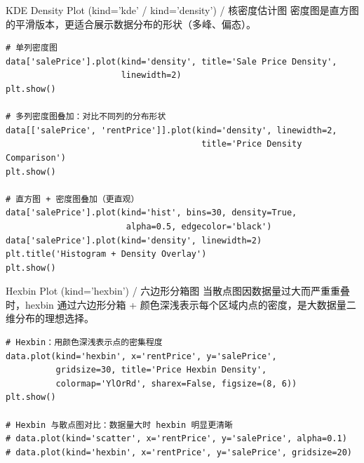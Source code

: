 \documentclass[11pt,a4paper]{report}
\begin{document}
\begin{examplebox}{KDE Density Plot (kind='kde' / kind='density') / 核密度估计图}
    密度图是直方图的平滑版本，更适合展示数据分布的形状（多峰、偏态）。
\begin{lstlisting}
# 单列密度图
data['salePrice'].plot(kind='density', title='Sale Price Density',
                       linewidth=2)
plt.show()

# 多列密度图叠加：对比不同列的分布形状
data[['salePrice', 'rentPrice']].plot(kind='density', linewidth=2,
                                       title='Price Density Comparison')
plt.show()

# 直方图 + 密度图叠加（更直观）
data['salePrice'].plot(kind='hist', bins=30, density=True,
                        alpha=0.5, edgecolor='black')
data['salePrice'].plot(kind='density', linewidth=2)
plt.title('Histogram + Density Overlay')
plt.show()
\end{lstlisting}
\end{examplebox}

\begin{examplebox}{Hexbin Plot (kind='hexbin') / 六边形分箱图}
    当散点图因数据量过大而严重重叠时，hexbin 通过六边形分箱 + 颜色深浅表示每个区域内点的密度，是大数据量二维分布的理想选择。
\begin{lstlisting}
# Hexbin：用颜色深浅表示点的密集程度
data.plot(kind='hexbin', x='rentPrice', y='salePrice',
          gridsize=30, title='Price Hexbin Density',
          colormap='YlOrRd', sharex=False, figsize=(8, 6))
plt.show()

# Hexbin 与散点图对比：数据量大时 hexbin 明显更清晰
# data.plot(kind='scatter', x='rentPrice', y='salePrice', alpha=0.1)
# data.plot(kind='hexbin', x='rentPrice', y='salePrice', gridsize=20)
\end{lstlisting}
\end{examplebox}
\end{document}
